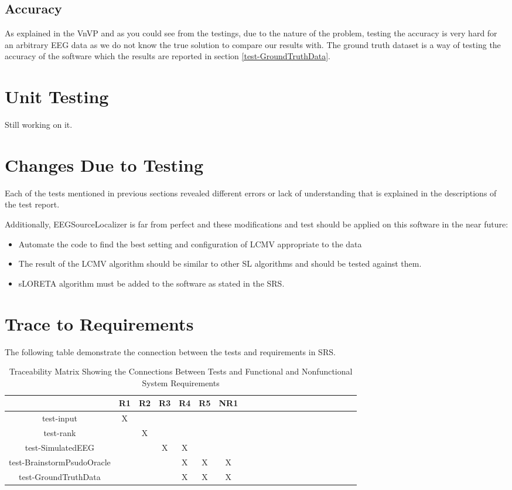 \documentclass[12pt, titlepage]{article}
\renewcommand{\progname}{EEGSourceLocalizer}
\begin{document}
\subsection{Accuracy}

As explained in the VnVP and as you could see from the testings, due to the nature of the problem, testing the accuracy is very hard for an arbitrary EEG data as we do not know the true solution to compare our results with. The ground truth dataset is a way of testing the accuracy of the software which the results are reported in section \ref{test-GroundTruthData}.
\section{Unit Testing}

Still working on it.

\section{Changes Due to Testing}

Each of the tests mentioned in previous sections revealed different errors or lack of understanding that is explained in the descriptions of the test report.

Additionally, \progname{} is far from perfect and these modifications and test should be applied on this software in the near future:

\begin{itemize}
\item Automate the code to find the best setting and configuration of LCMV appropriate to the data
\item The result of the LCMV algorithm should be similar to other SL algorithms and should be tested against them.
\item sLORETA algorithm must be added to the software as stated in the SRS.
\end{itemize}


\section{Trace to Requirements}
The following table demonstrate the connection between the tests and requirements in SRS.

\begin{table}[h!]
	\centering
	\begin{tabular}{|c|c|c|c|c|c|c|c|c|c|c|c|c|c|c|c|c|c|c|c|c|}
		\hline        
		& R1 & R2 & R3 & R4 & R5 & NR1 \\
		\hline
		test-input        &X & & & & & \\ \hline
		test-rank        & &X & & & &  \\ \hline
		test-SimulatedEEG        & & &X & X& & \\ \hline
		test-BrainstormPsudoOracle        & & & &X & X& X \\ \hline
		test-GroundTruthData   & & & &X & X& X \\ \hline
	\end{tabular}
\caption{Traceability Matrix Showing the Connections Between Tests and Functional and Nonfunctional System Requirements}
\label{Table:A_trace}
\end{table}
\end{document}
